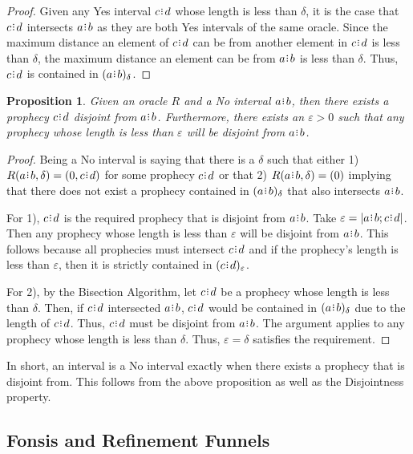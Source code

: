 \documentclass[12pt]{article}
\newtheorem{proposition}{Proposition}[section]
\begin{document}
\begin{proof}
    Given any Yes interval $c\rint d$ whose length is less than $\delta$, it is the case that $c\rint d$ intersects $a\rint b$ as they are both Yes intervals of the same oracle. Since the maximum distance an element of $c\rint d$ can be from another element in $c\rint d$ is less than $\delta$, the maximum distance an element can be from $a\rint b$ is less than $\delta$. Thus, $c\rint d$ is contained in $\halo{a\rint b}$.
\end{proof}

\begin{proposition}\label{os-no-disjoint}
    Given an oracle $R$ and a No interval $a\rint b$, then there exists a prophecy $c\rint d$ disjoint from $a\rint b$. Furthermore, there exists an $\varepsilon > 0$ such that any prophecy whose length is less than $\varepsilon$ will be disjoint from $a\rint b$.
\end{proposition}

\begin{proof}
    Being a No interval is saying that there is a $\delta$ such that either 1) $R(a\rint b, \delta) = (0, c\rint d)$ for some prophecy $c\rint d$ or that 2) $R(a\rint b, \delta) = (0)$ implying that there does not exist a prophecy contained in $\halo{a\rint b}$ that also intersects $a\rint b$. 
    
    For 1), $c\rint d$ is the required prophecy that is disjoint from $a\rint b$. Take $\varepsilon = |a\rint b; c\rint d|$. Then any prophecy whose length is less than $\varepsilon$ will be disjoint from $a\rint b$. This follows because all prophecies must intersect $c\rint d$ and if the prophecy's length is less than $\varepsilon$, then it is strictly contained in $\halo[\varepsilon]{c\rint d}$.
    
    For 2), by the Bisection Algorithm, let $c\rint d$ be a prophecy whose length is less than $\delta$. Then, if $c\rint d$ intersected $a\rint b$, $c\rint d$ would be contained in $\halo{a\rint b}$ due to the length of $c\rint d$. Thus, $c\rint d$ must be disjoint from $a\rint b$. The argument applies to any prophecy whose length is less than $\delta$. Thus, $\varepsilon = \delta$ satisfies the requirement. 
\end{proof}

In short, an interval is a No interval exactly when there exists a prophecy that is disjoint from. This follows from the above proposition as well as the Disjointness property. 

\subsection{Fonsis and Refinement Funnels}\label{os-fonsis}
\end{document}
